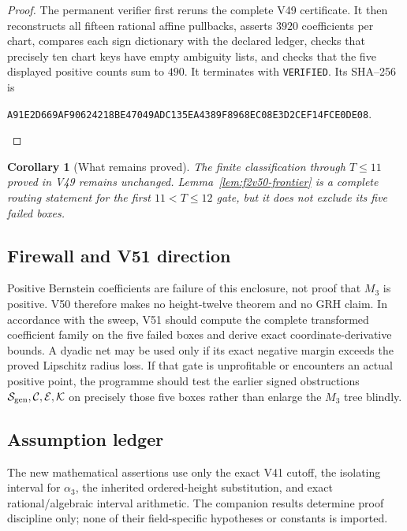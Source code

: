 \documentclass[11pt]{article}
\newtheorem{corollary}[theorem]{Corollary}
\theoremstyle{definition}
\theoremstyle{remark}
\begin{document}
\begin{proof}
The permanent verifier
first reruns the complete V49 certificate.  It then reconstructs all
fifteen rational affine pullbacks, asserts \(3920\) coefficients per
chart, compares each sign dictionary with the declared ledger, checks
that precisely ten chart keys have empty ambiguity lists, and checks that
the five displayed positive counts sum to \(490\).  It terminates with
\texttt{VERIFIED}.  Its SHA--256 is
\begin{center}
\texttt{A91E2D669AF90624218BE47049ADC135EA4389F8968EC08E3D2CEF14FCE0DE08}.
\end{center}
\end{proof}

\begin{corollary}[What remains proved]
\label{cor:f2v50-status}
The finite classification through \(T\le11\) proved in V49 remains
unchanged.  Lemma~\ref{lem:f2v50-frontier} is a complete routing statement
for the first \(11<T\le12\) gate, but it does not exclude its five failed
boxes.
\end{corollary}

\subsection*{Firewall and V51 direction}
\label{fire:f2v50}
Positive Bernstein coefficients are failure of this enclosure, not proof
that \(M_3\) is positive.  V50 therefore makes no height-twelve theorem
and no GRH claim.  In accordance with the sweep, V51 should compute the
complete transformed coefficient family on the five failed boxes and
derive exact coordinate-derivative bounds.  A dyadic net may be used only
if its exact negative margin exceeds the proved Lipschitz radius loss.
If that gate is unprofitable or encounters an actual positive point, the
programme should test the earlier signed obstructions
\(\mathcal S_{\rm gen},\mathcal C,\mathcal E,\mathcal K\) on precisely
those five boxes rather than enlarge the \(M_3\) tree blindly.

\subsection*{Assumption ledger}
\label{ass:f2v50}
The new mathematical assertions use only the exact V41 cutoff, the
isolating interval for \(\alpha_3\), the inherited ordered-height
substitution, and exact rational/algebraic interval arithmetic.  The
companion results determine proof discipline only; none of their
field-specific hypotheses or constants is imported.
\endgroup
\end{document}
